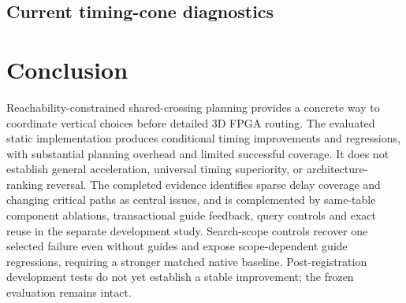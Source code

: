 \documentclass[conference,10pt]{IEEEtran}
\begin{document}














\subsection{Current timing-cone diagnostics}




















\section{Conclusion}
Reachability-constrained shared-crossing planning provides a concrete way to coordinate vertical choices before detailed 3D FPGA routing. The evaluated static implementation produces conditional timing improvements and regressions, with substantial planning overhead and limited successful coverage. It does not establish general acceleration, universal timing superiority, or architecture-ranking reversal. The completed evidence identifies sparse delay coverage and changing critical paths as central issues, and is complemented by same-table component ablations, transactional guide feedback, query controls and exact reuse in the separate development study. Search-scope controls recover one selected failure even without guides and expose scope-dependent guide regressions, requiring a stronger matched native baseline. Post-registration development tests do not yet establish a stable improvement; the frozen evaluation remains intact.
\end{document}
